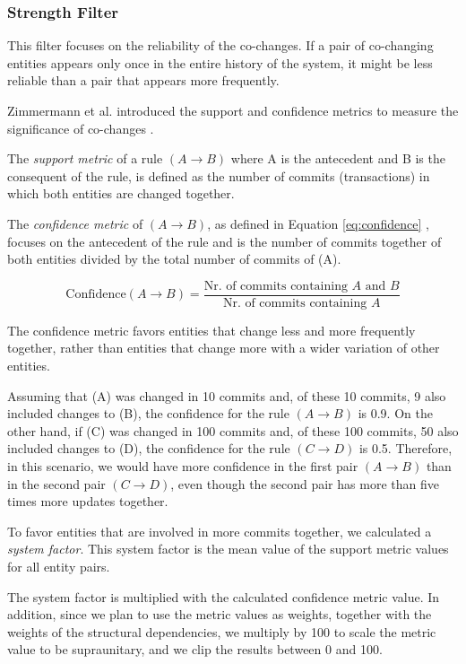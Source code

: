 \documentclass{ieeeaccess}
\begin{document}
\subsubsection{Strength Filter}

This filter focuses on the reliability of the co-changes. If a pair of co-changing entities appears only once in the entire history of the system, it might be less reliable than a pair that appears more frequently.

Zimmermann et al. introduced the support and confidence metrics to measure the significance of co-changes \cite{b7}.

The \textit{support metric} of a rule $(A \rightarrow B)$ where A is the antecedent and B is the consequent of the rule, is defined as the number of commits (transactions) in which both entities are changed together.

The \textit{confidence metric} of $(A \rightarrow B)$, as defined in Equation \eqref{eq:confidence} , focuses on the antecedent of the rule and is the number of commits together of both entities divided by the total number of commits of (A).


\begin{equation}
\text{Confidence}(A \rightarrow B) = \frac{\text{Nr. of commits containing } A \text{ and } B}{\text{Nr. of commits containing } A}
\label{eq:confidence}
\end{equation}


The confidence metric favors entities that change less and more frequently together, rather than entities that change more with a wider variation of other entities.

Assuming that (A) was changed in 10 commits and, of these 10 commits, 9 also included changes to (B), the confidence for the rule $(A \rightarrow B)$ is 0.9. On the other hand, if (C) was changed in 100 commits and, of these 100 commits, 50 also included changes to (D), the confidence for the rule $(C \rightarrow D)$ is 0.5. Therefore, in this scenario, we would have more confidence in the first pair $(A \rightarrow B)$ than in the second pair $(C \rightarrow D)$, even though the second pair has more than five times more updates together.

To favor entities that are involved in more commits together, we calculated a \textit{system factor}. This system factor is the mean value of the support metric values for all entity pairs.

The system factor is multiplied with the calculated confidence metric value. In addition, since we plan to use the metric values as weights, together with the weights of the structural dependencies, we multiply by 100 to scale the metric value to be supraunitary, and we clip the results between 0 and 100.
\end{document}
